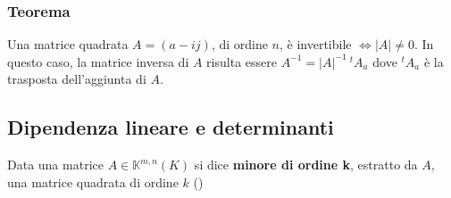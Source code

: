 \documentclass{article}
\begin{document}
\subsubsection{Teorema}
Una matrice quadrata $A = (a-{ij})$, di ordine $n$, è invertibile
$\iff|A|\ne0$. In questo caso, la matrice inversa di $A$ risulta essere
$A^{-1}=|A|^{-1}\ {^{t}A_a}$ dove ${^{t}A_a}$ è la trasposta dell'aggiunta di
$A$.

\subsection{Dipendenza lineare e determinanti}
Data una matrice $A\in{\mathbb{K}^{m,n}} (K)$ si dice \textbf{minore di ordine
    k}, estratto da $A$, una matrice quadrata di ordine $k$ ()
\end{document}
